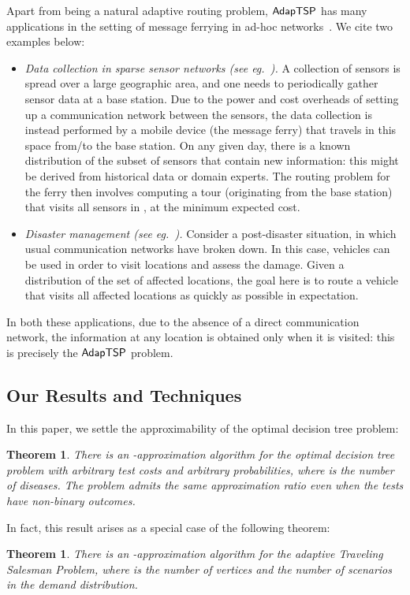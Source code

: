 \documentclass[11pt]{article}
\newtheorem{theorem}[thm]{Theorem}
\def\stsp{\ensuremath{{\sf AdapTSP}}\xspace}
\def\dtp{optimal decision tree problem\xspace}
\begin{document}
\medskip
Apart from being a natural adaptive routing problem, \stsp has many applications in the setting of message ferrying in
ad-hoc networks~\cite{ZA03,SRJB03,ZAZ04,ZAZ05,HLS10}. We cite two examples below:
\begin{itemize}
\item {\em Data collection in sparse sensor networks (see eg.~\cite{SRJB03}).} A collection of sensors is spread over a large geographic area, and
one needs to periodically gather sensor data at a base station. Due to the power and cost overheads of setting up a
communication network between the sensors, the data collection is instead performed by a mobile device (the message
ferry) that travels in this space from/to the base station. On any given day, there is a known distribution 
of the subset  of sensors that contain new information: this might be derived from historical data or domain
experts. The routing problem for the ferry then involves computing a tour (originating from the base station) that
visits all sensors in , at the minimum expected cost.

\item {\em Disaster management (see eg.~\cite{ZAZ04}).} Consider a post-disaster situation, in which usual
communication networks have broken down. In this case, vehicles can be used in order
to visit locations and assess the damage. Given a distribution of the set of affected locations, the goal here is to
route a vehicle that visits all affected locations as quickly as possible  in expectation.
\end{itemize}
In both these applications, due to the absence of a direct communication network, the information at any location is
obtained only when it is visited: this is precisely the \stsp problem.







\subsection{Our Results and Techniques}
In this paper, we settle the approximability of the \dtp:
\begin{theorem}
  \label{thm:main1}
  There is an -approximation algorithm for the \dtp with arbitrary test
  costs and arbitrary probabilities, where  is the number of diseases. The problem admits the same
  approximation ratio even when the tests have non-binary outcomes.
\end{theorem}
In fact, this result arises as a special case of the following theorem:
\begin{theorem}
  \label{thm:main2}
  There is an -approximation algorithm for
  the adaptive Traveling Salesman Problem, where  is the number of vertices and  the number of scenarios in the
  demand distribution.
\end{theorem}
\end{document}
